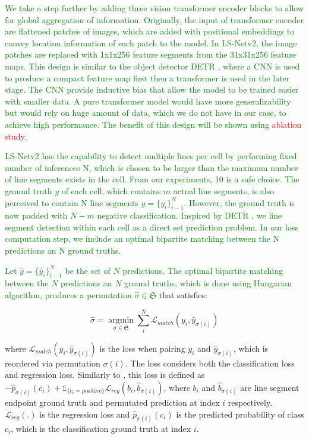 \documentclass[journal]{IEEEtran}
\begin{document}
\textcolor{green}{We take a step further by adding three vision transformer encoder blocks \cite{16x16, attention} to allow for global aggregation of information. Originally, the input of transformer encoder are flattened patches of images, which are added with positional embeddings to convey location information of each patch to the model. In LS-Netv2, the image patches are replaced with 1x1x256 feature segments from the 31x31x256 feature maps. This design is similar to the object detector DETR \cite{DETR}, where a CNN is used to produce a compact feature map first then a transformer is used in the later stage. The CNN provide inductive bias that allow the model to be trained easier with smaller data. A pure transformer model would have more generalizability \cite{?} but would rely on huge amount of data, which we do not have in our case, to achieve high performance. The benefit of this design will be shown using \textcolor{red}{ablation study}.}

\textcolor{green}{LS-Netv2 has the capability to detect multiple lines per cell by performing fixed number of inferences N, which is chosen to be larger than the maximum number of line segments exists in the cell. From our experiments, 10 is a safe choice. The ground truth $y$ of each cell, which contains $m$ actual line segments, is also perceived to contain N line segments $y=\{y_i\}^N_{i-1}$. However, the ground truth is now padded with $N-m$ negative classification. Inspired by DETR \cite{DETR}, we line segment detection within each cell as a direct set prediction problem. In our loss computation step, we include an optimal bipartite matching between the N predictions an N ground truths.}

\textcolor{green}{Let $\hat{y}=\{\hat{y}_i\}^N_{i-1}$ be the set of $N$ predictions. The optimal bipartite matching between the $N$ predictions an $N$ ground truths, which is done using Hungarian algorithm, produces a permutation $\hat{\sigma} \in \mathfrak{S}$} that satisfies:

\begin{equation} \label{bipartite_eqn}
\hat{\sigma} = \mathop{\arg \min}\limits_{\sigma \in \mathfrak{S}} \sum_i^N \mathcal{L}_{match} (y_i, \hat{y}_{\sigma(i)})
\end{equation}

where $\mathcal{L}_{match} (y_i, \hat{y}_{\sigma(i)})$ is the loss when pairing $y_i$ and $\hat{y}_{\sigma(i)}$, which is reordered via permutation $\sigma(i)$. The loss considers both the classification loss and regression loss. Similarly to \cite{DETR}, this loss is defined as $-\hat{p}_{\sigma(i)}(c_i) + \mathds{1}_{\{c_i=\text{positive}\}}\mathcal{L}_{reg}(b_i, \hat{b}_{\sigma(i)})$, where $b_i$ and $\hat{b}_{\sigma(i)}$ are line segment endpoint ground truth and permutated prediction at index $i$ respectively. $\mathcal{L}_{reg}(.)$ is the regression loss and $\hat{p}_{\sigma(i)}(c_i)$ is the predicted probability of class $c_i$, which is the classification ground truth at index $i$.
\end{document}
